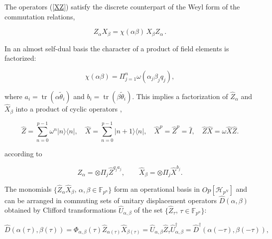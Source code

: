 \documentclass[quantumrep,article,submit,pdftex,moreauthors]{Definitions/mdpi}
\DeclareMathOperator{\tr}{tr}
\begin{document}
The operators (\ref{XZ}) satisfy the discrete counterpart of the Weyl form
of the commutation relations, 

\begin{equation}
Z_{\alpha }X_{\beta }=\chi \left( \alpha \beta \right) \,X_{\beta }Z_{\alpha
}\,.  \label{commutation_relation}
\end{equation}%

In an almost self-dual basis the character of a product of field elements is
factorized:

\begin{equation}
  \chi \left( \alpha \beta \right)
  = \Pi _{j=1}^{n}\omega \left( \alpha_{j}\beta _{j}q_{j}\right), 
  \label{chi fact}
\end{equation}

where $a_{i} = \tr(\alpha \tilde{\theta}_{i})$ and $b_{i} = \tr(\beta
\tilde{\theta }_{i})$. This implies a factorization of $\hat{Z}_{\alpha}$ and
$\hat{X}_{\beta }$ into a product of cyclic operators
\cite{Schwinger1,Schwinger2}, 

\begin{equation}
  \hat{Z} = \sum_{n=0}^{p-1}\omega ^{n}|n\rangle \langle n|,
  \quad \hat{X} = \sum_{n=0}^{p-1}|n+1\rangle \langle n|,
  \quad \hat{X}^{p} = \hat{Z}^{p} = \hat{I},
  \quad \hat{Z}\hat{X} = \omega \hat{X}\hat{Z}.
\end{equation}

according to 

\begin{equation}
  \hat{Z}_{\alpha } = \otimes \Pi _{j}\hat{Z}^{q_{j}a_{j}},
  \qquad \hat{X}_{\beta} = \otimes \Pi _{j}\hat{X}^{b_{j}}. 
  \label{ZXq}
\end{equation}

The monomials $\{\hat{Z}_{\alpha }\hat{X}_{\beta }$, $\alpha ,\beta \in
\mathbb{F}_{p^{n}}\}$ form an operational basis in $Op[\mathcal{H}_{p^{N}}]$ and
can be arranged in commuting sets of unitary displacement operators $
\hat{D}(\alpha,\beta)$ obtained by Clifford transformations
$\hat{U}_{\alpha,\beta}$ of the set $\{\hat{Z}_{\tau}$, $\tau \in \mathbb{F}
_{p^{n}}\}$:

\begin{equation}
  \hat{D}\left( \alpha (\tau ),\beta (\tau )\right)
  = \Phi_{\alpha,\beta}\left( \tau \right)
  \hat{Z}_{\alpha (\tau )}\hat{X}_{\beta (\tau )}
  = \hat{U}_{\alpha,\beta }\hat{Z}_{\tau }\hat{U}_{\alpha,\beta }^{\dagger }
  =\hat{D}^{\dagger }\left( \alpha (-\tau ),\beta (-\tau )\right), 
  \label{D}
\end{equation}
\end{document}
